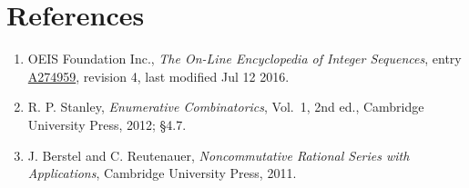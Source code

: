 \documentclass[11pt]{article}
\theoremstyle{definition}
\begin{document}
\section{References}

\begin{enumerate}

\item OEIS Foundation Inc., \emph{The On-Line Encyclopedia of Integer Sequences}, entry \href{https://oeis.org/A274959}{A274959}, revision 4, last modified Jul 12 2016.

\item R. P. Stanley, \emph{Enumerative Combinatorics}, Vol.~1, 2nd ed., Cambridge University Press, 2012; \S4.7.

\item J. Berstel and C. Reutenauer, \emph{Noncommutative Rational Series with Applications}, Cambridge University Press, 2011.

\end{enumerate}
\end{document}
